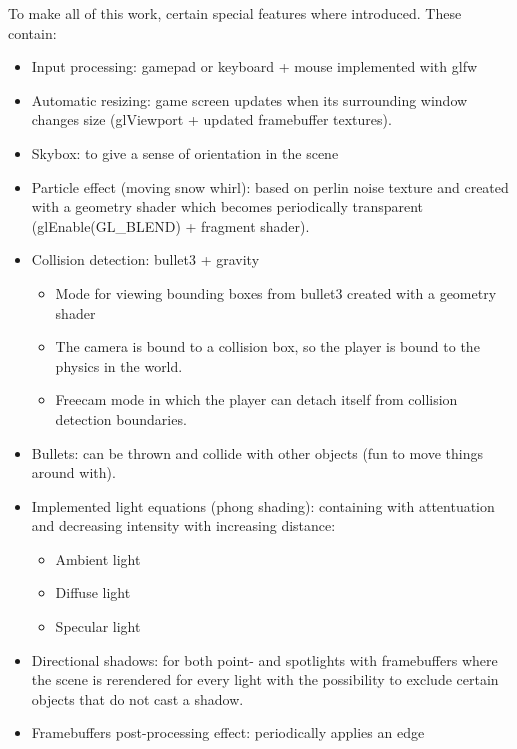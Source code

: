 \documentclass[]{article}
\begin{document}
To make all of this work, certain special features where introduced. These
contain:
\begin{itemize}
      \item Input processing: gamepad or keyboard + mouse implemented with glfw
      \item Automatic resizing: game screen updates when its surrounding window
            changes size (glViewport + updated framebuffer textures).
      \item Skybox: to give a sense of orientation in the scene
      \item Particle effect (moving snow whirl): based on perlin noise texture and
            created with a geometry shader which becomes periodically transparent
            (glEnable(GL\_BLEND) + fragment shader).
      \item Collision detection: bullet3 + gravity
            \begin{itemize}
                  \item Mode for viewing bounding boxes from bullet3 created with a
                        geometry shader
                  \item The camera is bound to a collision box, so the player is
                        bound to the physics in the world.
                  \item Freecam mode in which the player can detach itself from
                        collision detection boundaries.
            \end{itemize}
      \item Bullets: can be thrown and collide with other objects (fun to move
            things around with).
      \item Implemented light equations (phong shading): containing with
            attentuation and decreasing intensity with increasing distance:
            \begin{itemize}
                  \item Ambient light
                  \item Diffuse light
                  \item Specular light
            \end{itemize}
      \item Directional shadows: for both point- and spotlights with
            framebuffers where the scene is rerendered for every light with the
            possibility to exclude certain objects that do not cast a shadow.
      \item Framebuffers post-processing effect: periodically applies an edge

\end{itemize}
\end{document}
